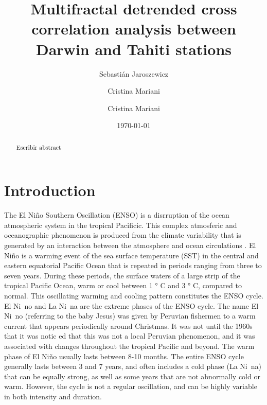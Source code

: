\documentclass[onecolumn, preprint,aps,amsmath, amssymb, superscriptaddress]{revtex4}
\begin{document}
\title{Multifractal detrended cross correlation analysis between Darwin and Tahiti stations}

\author{Sebastián Jaroszewicz}
\author{Cristina Mariani}
\author{Cristina Mariani}

\date{\today}

\begin{abstract}

Escribir abstract

\end{abstract}

\maketitle

\section{Introduction}
\label{sec:Intro}

The El Niño Southern Oscillation (ENSO) is a disrruption of the ocean atmospheric system in the tropical Pacificic. This complex atmosferic and oceanographic phenomenon is produced from the climate variability that is generated by an interaction between the atmosphere and ocean circulations \cite{Dijkstra,Sarachik,Philander}. El Niño is a warming event of the sea surface temperature (SST) in the central and eastern equatorial Pacific Ocean that is repeated in periods ranging from three to seven years. During these periods, the surface waters of a large strip of the tropical Pacific Ocean, warm or cool between 1 ° C and 3 ° C, compared to normal. This oscillating warming and cooling pattern constitutes the ENSO cycle. El Ni~no and La Ni~na are the extreme phases of the ENSO cycle. The name El Ni~no (referring to the baby Jesus) was given by Peruvian fishermen to a warm current that appears periodically around Christmas. It was not until the 1960s that it was notic ed that this was not a local Peruvian phenomenon, and it was associated with changes throughout the tropical Pacific and beyond. The warm phase of El Niño usually lasts between 8-10 months. The entire ENSO cycle generally lasts between 3 and 7 years, and often includes a cold phase (La Ni~na) that can be equally strong, as well as some years that are not abnormally cold or warm. However, the cycle is not a regular oscillation, and can be highly variable in both intensity and duration.
\end{document}

